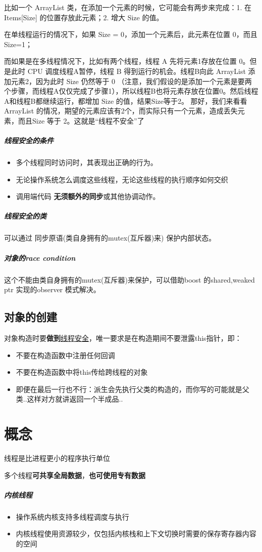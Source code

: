 \documentclass[UTF8,a4paper,12pt]{ctexbook}
\begin{document}
		比如一个 ArrayList 类，在添加一个元素的时候，它可能会有两步来完成：1. 在 Items[Size] 的位置存放此元素；2. 增大 Size 的值。
		
		在单线程运行的情况下，如果 Size = 0，添加一个元素后，此元素在位置 0，而且 Size=1；
		
		而如果是在多线程情况下，比如有两个线程，线程 A 先将元素1存放在位置 0。但是此时 CPU 调度线程A暂停，线程 B 得到运行的机会。线程B向此 ArrayList 添加元素2，因为此时 Size 仍然等于 0 （注意，我们假设的是添加一个元素是要两个步骤，而线程A仅仅完成了步骤1），所以线程B也将元素存放在位置0。然后线程A和线程B都继续运行，都增加 Size 的值，结果Size等于2。
		那好，我们来看看 ArrayList 的情况，期望的元素应该有2个，而实际只有一个元素，造成丢失元素，而且Size 等于 2。这就是“线程不安全”了
		\subparagraph{线程安全的条件}
			\begin{itemize}
				\item 多个线程同时访问时，其表现出正确的行为。
				\item 无论操作系统怎么调度这些线程，无论这些线程的执行顺序如何交织
				\item 调用端代码 \textbf{无须额外的同步}或其他协调动作。
			\end{itemize}
		\subparagraph{线程安全的类}可以通过 同步原语(类自身拥有的mutex(互斥器)来) 保护内部状态。
		\subparagraph{对象的race condition}这个不能由类自身拥有的mutex(互斥器)来保护，可以借助boost 的shared,weaked ptr 实现的observer 模式解决。
		
		\subsection{对象的创建}
			对象构造时要\textbf{做到}\underline{线程安全}，唯一要求是在构造期间不要泄露this指针，即：
				\begin{itemize}
					\item 不要在构造函数中注册任何回调
					\item 不要在构造函数中将this传给跨线程的对象
					\item 即便在最后一行也不行：派生会先执行父类的构造的，而你写的可能就是父类..这样对方就讲返回一个半成品..
				\end{itemize}
\section{概念}
	线程是比进程更小的程序执行单位
	
	多个线程\textbf{可共享全局数据}，\textbf{也可使用专有数据}	

	\subparagraph{内核线程}
		\begin{itemize}[itemindent = 1em]
			\item 操作系统内核支持多线程调度与执行
			\item 内核线程使用资源较少，仅包括内核栈和上下文切换时需要的保存寄存器内容的空间
		\end{itemize}
	
\end{document}

